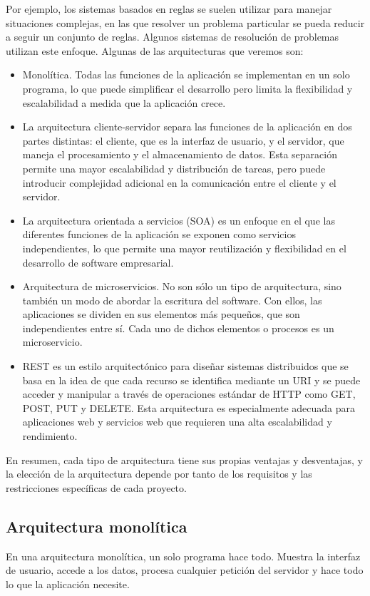 Por ejemplo, los sistemas basados en reglas se suelen utilizar para manejar situaciones complejas, en las que resolver un problema particular se pueda reducir a seguir un conjunto de reglas. Algunos sistemas de resolución de problemas utilizan este enfoque.
Algunas de las arquitecturas que veremos son:
\begin{itemize}
	\item Monolítica. Todas las funciones de la aplicación se implementan en un solo programa, lo que puede simplificar el desarrollo pero limita la flexibilidad y escalabilidad a medida que la aplicación crece.
	\item La arquitectura cliente-servidor separa las funciones de la aplicación en dos partes distintas: el cliente, que es la interfaz de usuario, y el servidor, que maneja el procesamiento y el almacenamiento de datos. Esta separación permite una mayor escalabilidad y distribución de tareas, pero puede introducir complejidad adicional en la comunicación entre el cliente y el servidor.
	\item La arquitectura orientada a servicios (SOA) es un enfoque en el que las diferentes funciones de la aplicación se exponen como servicios independientes, lo que permite una mayor reutilización y flexibilidad en el desarrollo de software empresarial.
	\item Arquitectura de microservicios. No son sólo un tipo de arquitectura, sino también un modo de abordar la escritura del software. Con ellos, las aplicaciones se dividen en sus elementos más pequeños, que son independientes entre sí. Cada uno de dichos elementos o procesos es un microservicio.
	\item REST es un estilo arquitectónico para diseñar sistemas distribuidos que se basa en la idea de que cada recurso se identifica mediante un URI y se puede acceder y manipular a través de operaciones estándar de HTTP como GET, POST, PUT y DELETE. Esta arquitectura es especialmente adecuada para aplicaciones web y servicios web que requieren una alta escalabilidad y rendimiento.
\end{itemize}

En resumen, cada tipo de arquitectura tiene sus propias ventajas y desventajas, y la elección de la arquitectura depende por tanto de los requisitos y las restricciones específicas de cada proyecto.
\subsection{Arquitectura monolítica}
En una arquitectura monolítica, un solo programa hace todo. Muestra la interfaz de usuario, accede a los datos, procesa cualquier petición del servidor y hace todo lo que la aplicación necesite.


